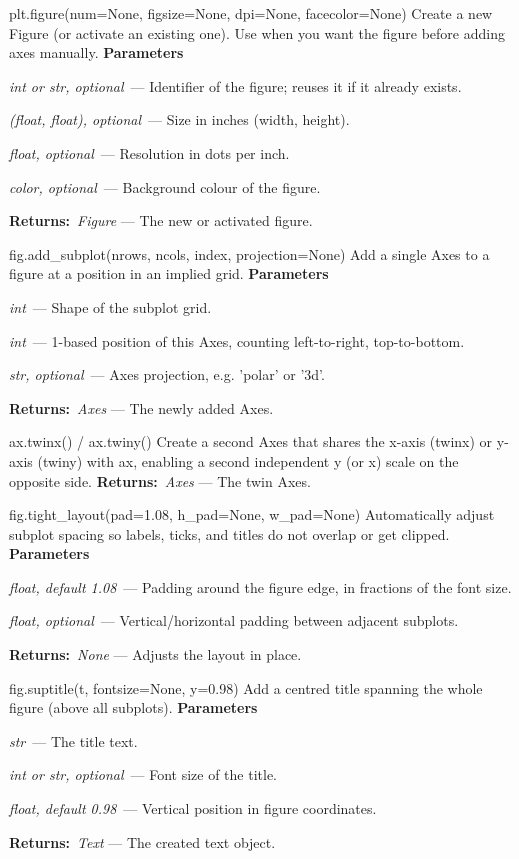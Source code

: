 \documentclass[10pt]{article}
\newenvironment{params}
  {\smallskip\textbf{\small\color{accent}Parameters}\par\nopagebreak
   \begin{description}[leftmargin=1.3em,itemsep=1.5pt,parsep=0pt,topsep=1pt,
      labelindent=0pt,style=sameline,font=\normalfont]}
  {\end{description}}
\newcommand{\pitem}[3]{\item[{\ttfamily\color{accent}#1}]{\itshape #2}\ --- #3}
\newcommand{\preturn}[2]{\smallskip\textbf{\small\color{accent}Returns:}\ {\itshape #1} --- #2\par}
\begin{document}
\begin{func}{plt.figure(num=None, figsize=None, dpi=None, facecolor=None)}
Create a new Figure (or activate an existing one). Use when you want the figure before adding axes manually.
\begin{params}
\pitem{num}{int or str, optional}{Identifier of the figure; reuses it if it already exists.}
\pitem{figsize}{(float, float), optional}{Size in inches (width, height).}
\pitem{dpi}{float, optional}{Resolution in dots per inch.}
\pitem{facecolor}{color, optional}{Background colour of the figure.}
\end{params}
\preturn{Figure}{The new or activated figure.}
\end{func}
\medskip

\begin{func}{fig.add\_subplot(nrows, ncols, index, projection=None)}
Add a single Axes to a figure at a position in an implied grid.
\begin{params}
\pitem{nrows, ncols}{int}{Shape of the subplot grid.}
\pitem{index}{int}{1-based position of this Axes, counting left-to-right, top-to-bottom.}
\pitem{projection}{str, optional}{Axes projection, e.g. 'polar' or '3d'.}
\end{params}
\preturn{Axes}{The newly added Axes.}
\end{func}
\medskip

\begin{func}{ax.twinx()  /  ax.twiny()}
Create a second Axes that shares the x-axis (twinx) or y-axis (twiny) with ax, enabling a second independent y (or x) scale on the opposite side.
\preturn{Axes}{The twin Axes.}
\end{func}
\medskip

\begin{func}{fig.tight\_layout(pad=1.08, h\_pad=None, w\_pad=None)}
Automatically adjust subplot spacing so labels, ticks, and titles do not overlap or get clipped.
\begin{params}
\pitem{pad}{float, default 1.08}{Padding around the figure edge, in fractions of the font size.}
\pitem{h\_pad, w\_pad}{float, optional}{Vertical/horizontal padding between adjacent subplots.}
\end{params}
\preturn{None}{Adjusts the layout in place.}
\end{func}
\medskip

\begin{func}{fig.suptitle(t, fontsize=None, y=0.98)}
Add a centred title spanning the whole figure (above all subplots).
\begin{params}
\pitem{t}{str}{The title text.}
\pitem{fontsize}{int or str, optional}{Font size of the title.}
\pitem{y}{float, default 0.98}{Vertical position in figure coordinates.}
\end{params}
\preturn{Text}{The created text object.}
\end{func}
\medskip
\end{document}
